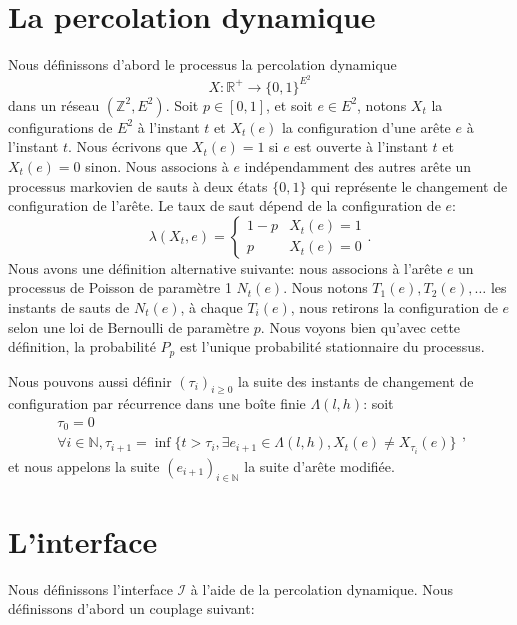 \documentclass[titlepage,a4paper,12pt]{article}
\begin{document}
\section{La percolation dynamique}
Nous définissons d'abord le processus la percolation dynamique $$X: \mathbb{R}^+ \rightarrow \{0,1\}^{E^2}$$ dans un réseau $(\mathbb{Z}^2,E^2)$. 
Soit $p\in [0,1]$, et soit $e\in E^2$, notons $X_t$ la configurations de $E^2$ à l'instant $t$ et $X_t(e)$ la configuration d'une arête $e$ à l'instant $t$. Nous écrivons que $X_t(e)= 1$ si $e$ est ouverte à l'instant $t$ et $X_t(e)=0$ sinon. Nous associons à $e$ indépendamment des autres arête un processus markovien de sauts à deux états $\{0,1\}$ qui représente le changement de configuration de l'arête. Le taux de saut dépend de la configuration de $e$:
$$\lambda(X_t,e) = \left\lbrace \begin{array}{lc}
1-p & X_t(e) = 1 \\
p & X_t(e) = 0
\end{array}
\right..
$$ 
Nous avons une définition alternative suivante: nous associons à l'arête $e$ un processus de Poisson de paramètre 1 $N_t(e)$. Nous notons $T_1(e),T_2(e),\dots$ les instants de sauts de $N_t(e)$, à chaque $T_i(e)$, nous retirons la configuration de $e$ selon une loi de Bernoulli de paramètre $p$. Nous voyons bien qu'avec cette définition, la probabilité $P_p$ est l'unique probabilité stationnaire du processus.

Nous pouvons aussi définir $(\tau_i)_{i\geqslant 0}$ la suite des instants de changement de configuration par récurrence dans une boîte finie $\Lambda(l,h)$: soit $$\left.
\begin{array}{l}
\tau_0 = 0 \\
\forall i\in \mathbb{N},\tau_{i+1} = \inf \{ t>\tau_i, \exists e_{i+1} \in \Lambda(l,h), X_t(e) \neq X_{\tau_i}(e)\}
\end{array}\right.,$$
et nous appelons la suite $(e_{i+1})_{i\in\mathbb{N}}$ la suite d'arête modifiée.
\section{L'interface}
Nous définissons l'interface $\mathcal{I}$ à l'aide de la percolation dynamique. Nous définissons d'abord un couplage suivant:
\end{document}
